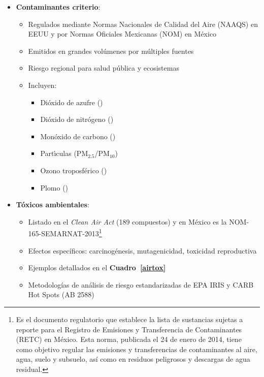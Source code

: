 \begin{itemize}
    \item \textbf{Contaminantes criterio}: 
    \begin{itemize}
        \item Regulados mediante Normas Nacionales de Calidad del Aire (NAAQS) en EEUU y por Normas Oficiales Mexicanas (NOM) en M\'exico
        \item Emitidos en grandes volúmenes por múltiples fuentes
        \item Riesgo regional para salud pública y ecosistemas
        \item Incluyen: 
        \begin{itemize}
            \item Dióxido de azufre ()
            \item Dióxido de nitrógeno ()
            \item Monóxido de carbono ()
            \item Part\'{\i}culas (PM$_{2.5}$/PM$_{10}$)
            \item Ozono troposférico ()
            \item Plomo ()
        \end{itemize}
    \end{itemize}
    
    \item \textbf{Tóxicos ambientales}:
    \begin{itemize}
        \item Listado en el \emph{Clean Air Act} (189 compuestos) y en M\'exico es la  NOM-165-SEMARNAT-2013\footnote{Es el documento regulatorio que establece la lista de sustancias sujetas a reporte para el Registro de Emisiones y Transferencia de Contaminantes (RETC) en México. Esta norma, publicada el 24 de enero de 2014, tiene como objetivo regular las emisiones y transferencias de contaminantes al aire, agua, suelo y subsuelo, así como en residuos peligrosos y descargas de agua residual.}
        \item Efectos específicos: carcinogénesis, mutagenicidad, toxicidad reproductiva
        \item Ejemplos detallados en el \textbf{Cuadro~\ref{airtox}}
        \item Metodologías de análisis de riesgo estandarizadas de EPA IRIS y  CARB Hot Spots (AB 2588)
    \end{itemize}
\end{itemize}

